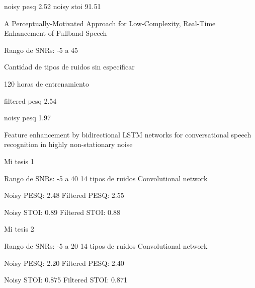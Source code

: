noisy pesq 2.52 
noisy stoi 91.51

A Perceptually-Motivated Approach for Low-Complexity, Real-Time Enhancement of Fullband Speech

Rango de SNRs: -5 a 45

Cantidad de tipos de ruidos sin especificar

120 horas de entrenamiento

filtered pesq 2.54

noisy pesq 1.97 



Feature enhancement by bidirectional LSTM networks for conversational speech recognition in highly non-stationary noise





Mi tesis 1

Rango de SNRs: -5 a 40
14 tipos de ruidos
Convolutional network

Noisy PESQ: 2.48
Filtered PESQ: 2.55

Noisy STOI: 0.89
Filtered STOI: 0.88

Mi tesis 2

Rango de SNRs: -5 a 20
14 tipos de ruidos
Convolutional network

Noisy PESQ: 2.20
Filtered PESQ: 2.40

Noisy STOI: 0.875
Filtered STOI: 0.871


